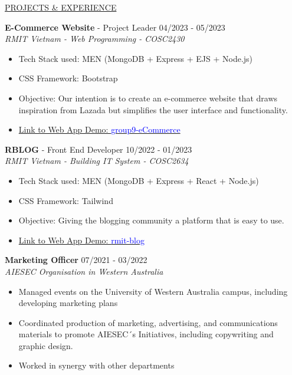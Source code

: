 \documentclass[11pt]{article}
\newcommand{\betteruline}[1]{
    \uline{#1}
}
\newcommand{\sectiontitle}[1]{
    \begingroup
        \titlebold
        \betteruline{\Large\uppercase{#1}  }
        \vspace{1.7mm}
    \endgroup
}
\newcommand{\sectioncontent}[1]{
    \begingroup
        \begin{FlushLeft}
        \vspace{-3mm}
        \sffamily\small#1
        \end{FlushLeft}
    \endgroup
    \vspace{2mm}
}
\newcommand{\job}[3]{
    \begingroup
        \textbf{\small#1} - \small#2
        \hfill\color{black!70}\small{#3}
    \endgroup
}
\newcommand{\project}[2]{
    \begingroup
        \textbf{\small#1}
        \hfill\color{black!70}\small{#2}
    \endgroup
}
\newcommand{\spacevv}{
    \vspace{2mm}
}
\begin{document}
\begin{paracol}{2}
    \sectiontitle{Projects \& Experience}
    \sectioncontent{
      \job{E-Commerce Website}{Project Leader}{04/2023 - 05/2023} \\
      \textcolor{black!70}{\textit{RMIT Vietnam - Web Programming - COSC2430}}
\vspace{1mm}
      \begin{itemize}
        \item Tech Stack used: MEN (MongoDB + Express + EJS + Node.js)
\vspace{1mm}
        \item CSS Framework: Bootstrap
\vspace{1mm}
        \item Objective: Our intention is to create an e-commerce website that draws inspiration from Lazada but simplifies the user interface and functionality.
\vspace{1mm}
        \item  \href{https://group9ecommerceweb-dolelongan.b4a.run/}{Link to Web App Demo: \textcolor{blue}{group9-eCommerce}}
      \end{itemize}
      \spacevv
\vspace{2mm}
\job{RBLOG}{Front End Developer}{10/2022 - 01/2023} \\
      \textcolor{black!70}{\textit{RMIT Vietnam - Building IT System - COSC2634}}
\vspace{1mm}
      \begin{itemize}
        \item Tech Stack used: MEN (MongoDB + Express + React + Node.js)
\vspace{1mm}
        \item CSS Framework: Tailwind
\vspace{1mm}
        \item Objective: Giving the blogging community a platform that is easy to use.
\vspace{1mm}
        \item  \href{https://rmit-blog.netlify.app/}{Link to Web App Demo: \textcolor{blue}{rmit-blog}}
      \end{itemize}
      \spacevv
\vspace{2mm}
\project{Marketing Officer}{07/2021 - 03/2022} \\
\textcolor{black!70}{\textit{AIESEC Organisation in Western Australia}}
\vspace{1mm}
      \begin{itemize}
        \item Managed events on the University of Western Australia campus, including developing marketing plans
\vspace{1mm}
        \item Coordinated production of marketing, advertising, and communications materials to promote AIESEC´s Initiatives, including copywriting and graphic design.
\vspace{1mm}
        \item Worked in synergy with other departments
      \end{itemize}
    }


\end{paracol}
\end{document}
